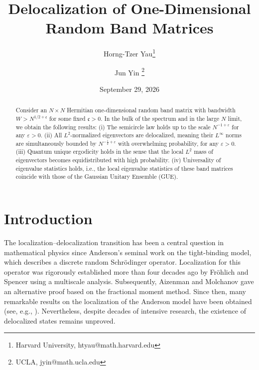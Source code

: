 \documentclass[10pt,reqno]{article}
\title{Delocalization of One-Dimensional Random Band Matrices}
\author{
    Horng-Tzer Yau\thanks{Harvard University, htyau@math.harvard.edu} \and
  Jun Yin \thanks{UCLA, jyin@math.ucla.edu}
}
\date{September 29, 2026}
\theoremstyle{plain} %
\theoremstyle{remark}
\numberwithin{equation}{section}
\begin{document}

 

\maketitle


\begin{abstract}
  

Consider an $ N \times N$ Hermitian one-dimensional random band matrix with bandwidth $W > N^{1 / 2 + \mathfrak c}$ for some fixed $\mathfrak c > 0$. In the bulk of the spectrum and in the large $N$ limit, we obtain the following results: (i) The semicircle law holds up to the scale $N^{-1 + \varepsilon}$ for any $\varepsilon > 0$. (ii) All $L^2$-normalized eigenvectors are delocalized, meaning their $L^\infty$ norms are simultaneously bounded by $N^{-\frac{1}{2} + \varepsilon}$ with overwhelming probability, for any $\varepsilon > 0$. (iii) Quantum unique ergodicity holds in the sense that the local $L^2$ mass of eigenvectors becomes equidistributed with high probability. (iv) Universality of eigenvalue statistics holds, i.e., the local eigenvalue statistics of these band matrices coincide with those of the Gaussian Unitary Ensemble (GUE). 



\end{abstract}

 
\newpage

\tableofcontents

\newpage

 

\section{Introduction}


The localization--delocalization transition has been a central question in mathematical physics since Anderson's seminal work on the tight-binding model, which describes a discrete random Schr\"odinger operator. Localization for this operator was rigorously established more than four decades ago by Fr{\"o}hlich and Spencer \cite{FroSpen_1983} using a multiscale analysis. Subsequently, Aizenman and Molchanov \cite{Aizenman1993} gave an alternative  proof based on the fractional moment method. Since then, many remarkable results on the localization of the Anderson model have been obtained (see, e.g.,
\cite{FroSpen_1985,Bourgain2005,Carmona1987,DingSmart2020,Damanik2002,Germinet2013,LiZhang2019}). Nevertheless, despite decades of intensive research, the existence of delocalized states remains unproved.
\end{document}
